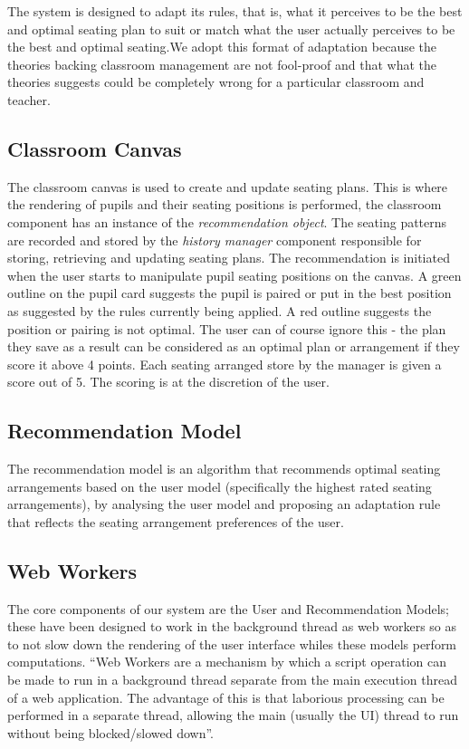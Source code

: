 The system is designed to adapt its rules, that is, what it perceives to be the best and optimal seating plan to suit or match what the user actually perceives to be the best and optimal seating.We adopt this format of adaptation because the theories backing classroom management are not fool-proof and that what the theories suggests could be completely wrong for a particular classroom and teacher.

\subsection{Classroom Canvas} \label{sub:classroom}
The classroom canvas is used to create and update seating plans. This is where the rendering of pupils and their seating positions is performed, the classroom component has an instance of the \emph{recommendation object}. The seating patterns are recorded and stored by the \emph{history manager} component responsible for storing, retrieving and updating seating plans. The recommendation is initiated when the user starts to manipulate pupil seating positions on the canvas. A green outline on the pupil card suggests the pupil is paired or put in the best position as suggested by the rules currently being applied. A red outline suggests the position or pairing is not optimal. The user can of course ignore this - the plan they save as a result can be considered as an optimal plan or arrangement if they score it above 4 points. Each seating arranged store by the manager is given a score out of 5. The scoring is at the discretion of the user.

\subsection{Recommendation Model}
The recommendation model is an algorithm that recommends optimal seating arrangements based on the user model (specifically the highest rated seating arrangements), by analysing the user model and proposing an adaptation rule that reflects the seating arrangement preferences of the user. 

\subsection{Web Workers}
The core components of our system are the User and Recommendation Models; these have been designed to work in the background thread as web workers so as to not slow down the rendering of the user interface whiles these models perform computations. ``Web Workers are a mechanism by which a script operation can be made to run in a background thread separate from the main execution thread of a web application. The advantage of this is that laborious processing can be performed in a separate thread, allowing the main (usually the UI) thread to run without being blocked/slowed down''.\cite{website:Mozilla-WebWorkers}

